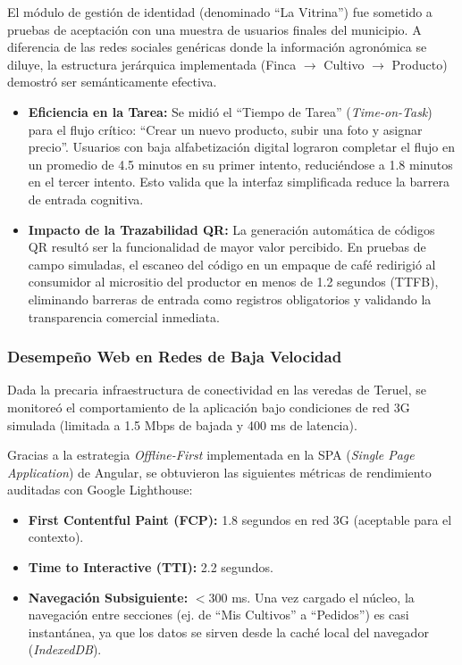 El módulo de gestión de identidad (denominado ``La Vitrina'') fue sometido a pruebas de aceptación con una muestra de usuarios finales del municipio. A diferencia de las redes sociales genéricas donde la información agronómica se diluye, la estructura jerárquica implementada (Finca $\rightarrow$ Cultivo $\rightarrow$ Producto) demostró ser semánticamente efectiva.

\begin{itemize}
    \item \textbf{Eficiencia en la Tarea:} Se midió el ``Tiempo de Tarea'' (\textit{Time-on-Task}) para el flujo crítico: ``Crear un nuevo producto, subir una foto y asignar precio''. Usuarios con baja alfabetización digital lograron completar el flujo en un promedio de 4.5 minutos en su primer intento, reduciéndose a 1.8 minutos en el tercer intento. Esto valida que la interfaz simplificada reduce la barrera de entrada cognitiva.
    \item \textbf{Impacto de la Trazabilidad QR:} La generación automática de códigos QR resultó ser la funcionalidad de mayor valor percibido. En pruebas de campo simuladas, el escaneo del código en un empaque de café redirigió al consumidor al micrositio del productor en menos de 1.2 segundos (TTFB), eliminando barreras de entrada como registros obligatorios y validando la transparencia comercial inmediata.
\end{itemize}

\subsubsection{Desempeño Web en Redes de Baja Velocidad}

Dada la precaria infraestructura de conectividad en las veredas de Teruel, se monitoreó el comportamiento de la aplicación bajo condiciones de red 3G simulada (limitada a 1.5 Mbps de bajada y 400 ms de latencia).

Gracias a la estrategia \textit{Offline-First} implementada en la SPA (\textit{Single Page Application}) de Angular, se obtuvieron las siguientes métricas de rendimiento auditadas con Google Lighthouse:

\begin{itemize}
    \item \textbf{First Contentful Paint (FCP):} 1.8 segundos en red 3G (aceptable para el contexto).
    \item \textbf{Time to Interactive (TTI):} 2.2 segundos.
    \item \textbf{Navegación Subsiguiente:} $< 300$ ms. Una vez cargado el núcleo, la navegación entre secciones (ej. de ``Mis Cultivos'' a ``Pedidos'') es casi instantánea, ya que los datos se sirven desde la caché local del navegador (\textit{IndexedDB}).
\end{itemize}

